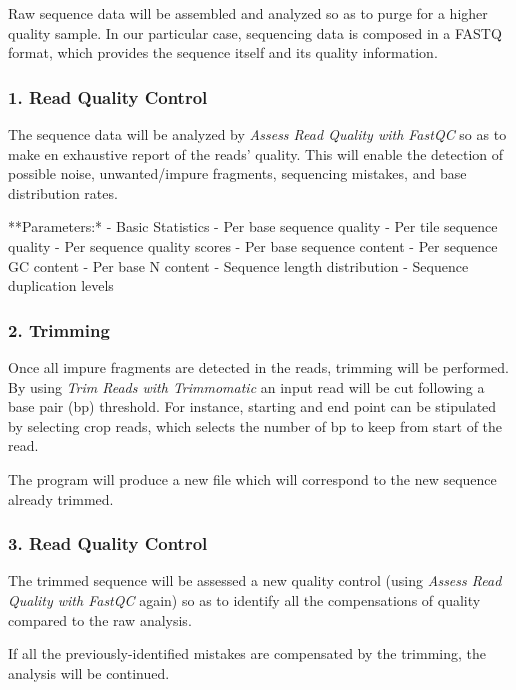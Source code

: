 \documentclass[
]{article}
\begin{document}
Raw sequence data will be assembled and analyzed so as to purge for a
higher quality sample. In our particular case, sequencing data is
composed in a FASTQ format, which provides the sequence itself and its
quality information.

\hypertarget{read-quality-control}{%
\subsubsection{1. Read Quality Control}\label{read-quality-control}}

The sequence data will be analyzed by \emph{Assess Read Quality with
FastQC} so as to make en exhaustive report of the reads' quality. This
will enable the detection of possible noise, unwanted/impure fragments,
sequencing mistakes, and base distribution rates.

**Parameters:* - Basic Statistics - Per base sequence quality - Per tile
sequence quality - Per sequence quality scores - Per base sequence
content - Per sequence GC content - Per base N content - Sequence length
distribution - Sequence duplication levels

\hypertarget{trimming}{%
\subsubsection{2. Trimming}\label{trimming}}

Once all impure fragments are detected in the reads, trimming will be
performed. By using \emph{Trim Reads with Trimmomatic} an input read
will be cut following a base pair (bp) threshold. For instance, starting
and end point can be stipulated by selecting crop reads, which selects
the number of bp to keep from start of the read.

The program will produce a new file which will correspond to the new
sequence already trimmed.

\hypertarget{read-quality-control-1}{%
\subsubsection{3. Read Quality Control}\label{read-quality-control-1}}

The trimmed sequence will be assessed a new quality control (using
\emph{Assess Read Quality with FastQC} again) so as to identify all the
compensations of quality compared to the raw analysis.

If all the previously-identified mistakes are compensated by the
trimming, the analysis will be continued.
\end{document}
